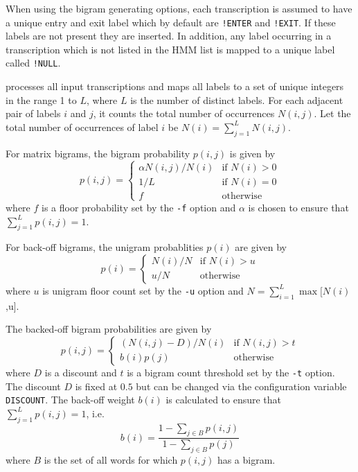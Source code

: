 
When using the bigram generating options, each transcription is 
assumed to have a unique entry and exit label which by default are
\texttt{!ENTER} and \texttt{!EXIT}.  If these labels are not present
they are inserted.  In addition, any label occurring in a transcription
which is not listed in the HMM list is mapped to a unique label called
\texttt{!NULL}.

 processes all input transcriptions and
maps all labels to a set of unique integers in the range 1 to $L$, where
$L$ is the number of distinct labels.  
For each adjacent pair of labels $i$
and $j$, it counts the total number of occurrences $N(i,j)$.
Let the total
number of occurrences of label $i$ be $N(i) = \sum_{j=1}^L N(i,j)$.

For matrix bigrams, the bigram probability $p(i,j)$ is given by
\[
   p(i,j) = \left\{
      \begin{array}{ll}
           \alpha N(i,j)/N(i) & \mbox{if $N(i) > 0$} \\
           1/L & \mbox{if $N(i) = 0$} \\
           f   & \mbox{otherwise}
       \end{array}
   \right. 
\]
where $f$ is a floor probability set by the \texttt{-f} option
and $\alpha$ is chosen to ensure that $\sum_{j=1}^L p(i,j) = 1$.

For back-off bigrams, the unigram probablities $p(i)$ are given
by
\[
   p(i) = \left\{
      \begin{array}{ll}
           N(i)/N & \mbox{if $N(i) > u$} \\
                   u/N   & \mbox{otherwise}
       \end{array}
   \right. 
\]
where $u$ is unigram floor count set by the \texttt{-u} option
and $N = \sum_{i=1}^L \max [N(i)$,u].

The backed-off bigram probabilities are given by
\[
   p(i,j) = \left\{
      \begin{array}{ll}
           (N(i,j) - D )/N(i) & \mbox{if $N(i,j) > t$} \\
                  b(i) p(j)  & \mbox{otherwise}
       \end{array}
   \right. 
\]
where $D$ is a discount and $t$ is a bigram count threshold set
by the \texttt{-t} option.  The discount $D$ is fixed at $0.5$ 
but can be changed via the configuration variable \texttt{DISCOUNT}.
The back-off weight $b(i)$ is calculated to ensure 
that $\sum_{j=1}^L p(i,j) = 1$, i.e.
\[
  b(i) = \frac{1 - \sum_{j \in B} p(i,j)}{1 - \sum_{j \in B} p(j)}
\]
where $B$ is the set of all words for which $p(i,j)$ has a bigram.

